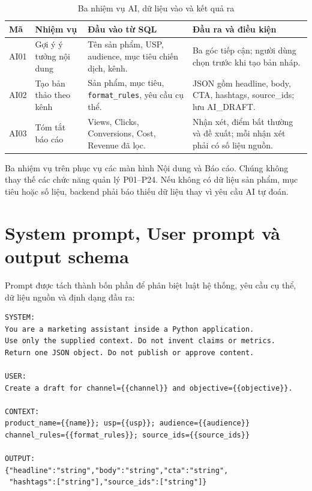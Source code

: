 \begin{table}[h!]
\centering
\small
\caption{Ba nhiệm vụ AI, dữ liệu vào và kết quả ra}
\begin{tabularx}{\textwidth}{|L{2.8cm}|L{4.4cm}|Y|Y|}
\hline
\textbf{Mã} & \textbf{Nhiệm vụ} & \textbf{Đầu vào từ SQL} & \textbf{Đầu ra và điều kiện}\\\hline
AI01 & Gợi ý ý tưởng nội dung & Tên sản phẩm, USP, audience, mục tiêu chiến dịch, kênh. & Ba góc tiếp cận; người dùng chọn trước khi tạo bản nháp.\\\hline
AI02 & Tạo bản thảo theo kênh & Sản phẩm, mục tiêu, \texttt{format\_rules}, yêu cầu cụ thể. & JSON gồm headline, body, CTA, hashtags, source\_ids; lưu AI\_DRAFT.\\\hline
AI03 & Tóm tắt báo cáo & Views, Clicks, Conversions, Cost, Revenue đã lọc. & Nhận xét, điểm bất thường và đề xuất; mỗi nhận xét phải có số liệu nguồn.\\\hline
\end{tabularx}
\end{table}

Ba nhiệm vụ trên phục vụ các màn hình Nội dung và Báo cáo. Chúng không thay thế các chức năng quản lý P01--P24. Nếu không có dữ liệu sản phẩm, mục tiêu hoặc số liệu, backend phải báo thiếu dữ liệu thay vì yêu cầu AI tự đoán.

\section{System prompt, User prompt và output schema}

Prompt được tách thành bốn phần để phân biệt luật hệ thống, yêu cầu cụ thể, dữ liệu nguồn và định dạng đầu ra:

\begin{lstlisting}[language={},caption={Prompt mẫu cho AI02}]
SYSTEM:
You are a marketing assistant inside a Python application.
Use only the supplied context. Do not invent claims or metrics.
Return one JSON object. Do not publish or approve content.

USER:
Create a draft for channel={{channel}} and objective={{objective}}.

CONTEXT:
product_name={{name}}; usp={{usp}}; audience={{audience}}
channel_rules={{format_rules}}; source_ids={{source_ids}}

OUTPUT:
{"headline":"string","body":"string","cta":"string",
 "hashtags":["string"],"source_ids":["string"]}
\end{lstlisting}

